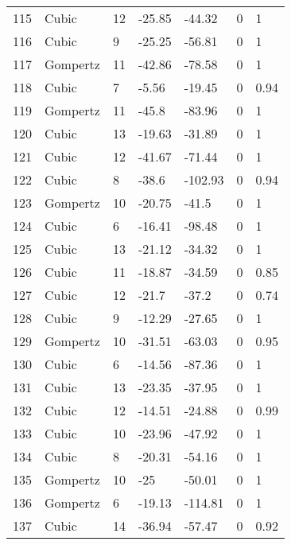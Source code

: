 \documentclass[11pt]{article}
\begin{document}
\begin{center}
\begin{longtable}{lllllll}
    115 & Cubic     & 12              & -25.85  & -44.32  & 0       & 1    \\
    116 & Cubic     & 9               & -25.25  & -56.81  & 0       & 1    \\
    117 & Gompertz  & 11              & -42.86  & -78.58  & 0       & 1    \\
    118 & Cubic     & 7               & -5.56   & -19.45  & 0       & 0.94 \\
    119 & Gompertz  & 11              & -45.8   & -83.96  & 0       & 1    \\
    120 & Cubic     & 13              & -19.63  & -31.89  & 0       & 1    \\
    121 & Cubic     & 12              & -41.67  & -71.44  & 0       & 1    \\
    122 & Cubic     & 8               & -38.6   & -102.93 & 0       & 0.94 \\
    123 & Gompertz  & 10              & -20.75  & -41.5   & 0       & 1    \\
    124 & Cubic     & 6               & -16.41  & -98.48  & 0       & 1    \\
    125 & Cubic     & 13              & -21.12  & -34.32  & 0       & 1    \\
    126 & Cubic     & 11              & -18.87  & -34.59  & 0       & 0.85 \\
    127 & Cubic     & 12              & -21.7   & -37.2   & 0       & 0.74 \\
    128 & Cubic     & 9               & -12.29  & -27.65  & 0       & 1    \\
    129 & Gompertz  & 10              & -31.51  & -63.03  & 0       & 0.95 \\
    130 & Cubic     & 6               & -14.56  & -87.36  & 0       & 1    \\
    131 & Cubic     & 13              & -23.35  & -37.95  & 0       & 1    \\
    132 & Cubic     & 12              & -14.51  & -24.88  & 0       & 0.99 \\
    133 & Cubic     & 10              & -23.96  & -47.92  & 0       & 1    \\
    134 & Cubic     & 8               & -20.31  & -54.16  & 0       & 1    \\
    135 & Gompertz  & 10              & -25     & -50.01  & 0       & 1    \\
    136 & Gompertz  & 6               & -19.13  & -114.81 & 0       & 1    \\
    137 & Cubic     & 14              & -36.94  & -57.47  & 0       & 0.92 \\

\end{longtable}
\end{center}
\end{document}
